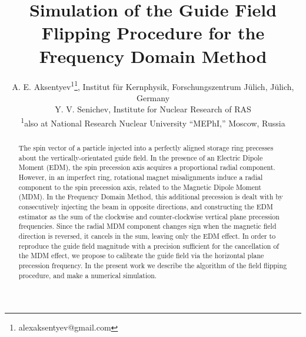\documentclass[a4paper]{jacow}
\begin{document}
\title{Simulation of the Guide Field Flipping Procedure for the Frequency Domain Method}
\author{A. E. Aksentyev\textsuperscript{1}\thanks{alexaksentyev@gmail.com},
  Institut f\"ur Kernphysik, Forschungszentrum J\"ulich, J\"ulich, Germany \\
  Y. V. Senichev, Institute for Nuclear Research of RAS \\
  \textsuperscript{1}also at National Research Nuclear University ``MEPhI,'' Moscow, Russia}
\maketitle
{}
\begin{abstract}
  The spin vector of a particle injected into a perfectly aligned storage ring precesses about the vertically-orientated guide field. In the presence of an Electric Dipole Moment (EDM), the spin precession axis acquires a proportional radial component.
  However, in an imperfect ring, rotational magnet misalignments induce a radial component to the spin precession axis, related to the Magnetic Dipole Moment (MDM). In the Frequency Domain Method, this additional precession is dealt with by consecutively injecting the beam in opposite directions, and constructing the EDM estimator as the sum of the clockwise and counter-clockwise vertical plane precession frequencies. Since the radial MDM component changes sign when the magnetic field direction is reversed, it cancels in the sum, leaving only the EDM effect. 
  In order to reproduce the guide field magnitude with a precision sufficient for the cancellation of the MDM effect, we propose to calibrate the guide field via the horizontal plane precession frequency. In the present work we describe the algorithm of the field flipping procedure, and make a numerical simulation.
\end{abstract}
\end{document}
